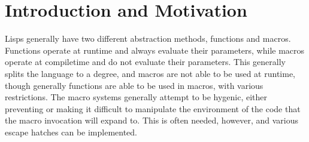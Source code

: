 \documentclass[acmsmall]{acmart}
\begin{document}




\maketitle

\section{Introduction and Motivation}

  Lisps generally have two different abstraction methods, functions and macros. Functions operate at runtime and always
  evaluate their parameters, while macros operate at compiletime and do not evaluate their parameters. This generally
  splits the language to a degree, and macros are not able to be used at runtime, though generally functions are
  able to be used in macros, with various restrictions. The macro systems generally attempt to be hygenic, either preventing
  or making it difficult to manipulate the environment of the code that the macro invocation will expand to. This is often
  needed, however, and various escape hatches can be implemented.
\end{document}
